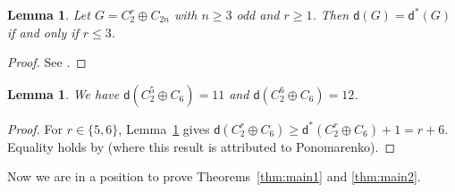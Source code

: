 \documentclass[11pt,a4paper]{amsart}
\theoremstyle{plain}
\newtheorem{lemma}[theorem]{\bf Lemma}
\theoremstyle{definition}
\newcommand{\dd}{\mathsf d}
\begin{document}
\begin{lemma} \label{2.1}
Let $G = C_2^r \oplus C_{2n}$ with $n\ge3$ odd and $r\ge1$. 
Then $\mathsf d(G)=\mathsf d^*(G)$ if and only if $r\le3$.
\end{lemma}

\begin{proof}
See \cite[Theorem 3.9.7]{Ge-Gr-Zh26a}.
\end{proof}

\begin{lemma}\label{lem:davenport}
We have  $\dd(C_2^5\oplus C_6)=11$ and $\dd(C_2^6\oplus C_6)=12$.
\end{lemma}

\begin{proof}
For $r\in\{5,6\}$, Lemma~\ref{2.1} gives
$\mathsf d(C_2^r\oplus C_6)
 \ge \mathsf d^*(C_2^r\oplus C_6)+1=r+6.$
Equality holds by
\cite[p.~2]{Sc11b} (where this result is  attributed to Ponomarenko).
\end{proof}



Now we are in a position to prove Theorems~\ref{thm:main1} and \ref{thm:main2}.
\end{document}
